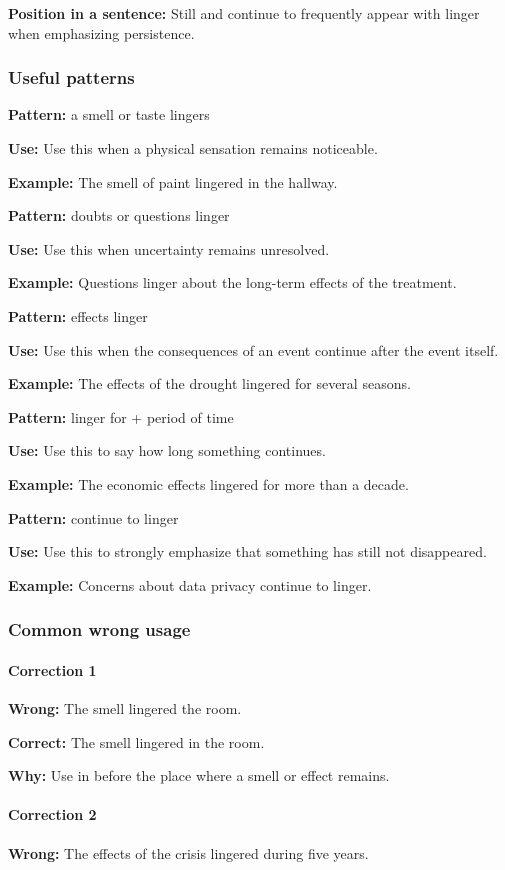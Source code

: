 \documentclass[11pt]{article}
\begin{document}
\textbf{Position in a sentence:} Still and continue to frequently appear with linger when emphasizing persistence.

\subsubsection{Useful patterns}
\textbf{Pattern:} a smell or taste lingers

\textbf{Use:} Use this when a physical sensation remains noticeable.

\textbf{Example:} The smell of paint lingered in the hallway.

\textbf{Pattern:} doubts or questions linger

\textbf{Use:} Use this when uncertainty remains unresolved.

\textbf{Example:} Questions linger about the long-term effects of the treatment.

\textbf{Pattern:} effects linger

\textbf{Use:} Use this when the consequences of an event continue after the event itself.

\textbf{Example:} The effects of the drought lingered for several seasons.

\textbf{Pattern:} linger for + period of time

\textbf{Use:} Use this to say how long something continues.

\textbf{Example:} The economic effects lingered for more than a decade.

\textbf{Pattern:} continue to linger

\textbf{Use:} Use this to strongly emphasize that something has still not disappeared.

\textbf{Example:} Concerns about data privacy continue to linger.

\subsubsection{Common wrong usage}
\paragraph{Correction 1}
\textbf{Wrong:} The smell lingered the room.

\textbf{Correct:} The smell lingered in the room.

\textbf{Why:} Use in before the place where a smell or effect remains.

\paragraph{Correction 2}
\textbf{Wrong:} The effects of the crisis lingered during five years.
\end{document}
